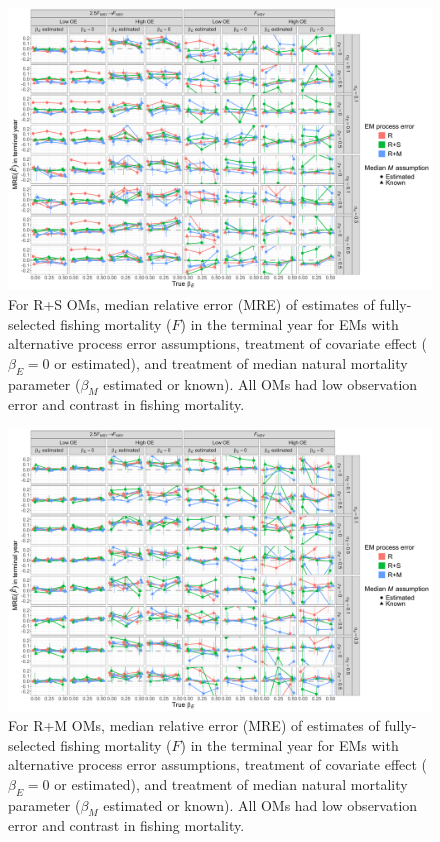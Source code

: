 \documentclass[
  12pt,
]{article}
\begin{document}
\begin{landscape}
\begin{figure}
\begin{center}
\includegraphics[height = \textheight]{terminal_year_F_bias_RSom}
\end{center}
\caption{For R+S OMs, median relative error (MRE) of estimates of fully-selected fishing mortality ($F$) in the terminal year for EMs with alternative process error assumptions, treatment of covariate effect ($\beta_E = 0$ or estimated), and treatment of median natural mortality parameter ($\beta_M$ estimated or known). All OMs had low observation error and contrast in fishing mortality.}\label{terminal_F_bias_RSom}
\end{figure}
\end{landscape}

\begin{landscape}
\begin{figure}
\begin{center}
\includegraphics[height = \textheight]{terminal_year_F_bias_RMom}
\end{center}
\caption{For R+M OMs, median relative error (MRE) of estimates of fully-selected fishing mortality ($F$) in the terminal year for EMs with alternative process error assumptions, treatment of covariate effect ($\beta_E = 0$ or estimated), and treatment of median natural mortality parameter ($\beta_M$ estimated or known). All OMs had low observation error and contrast in fishing mortality.}\label{terminal_F_bias_RMom}
\end{figure}
\end{landscape}
\end{document}

